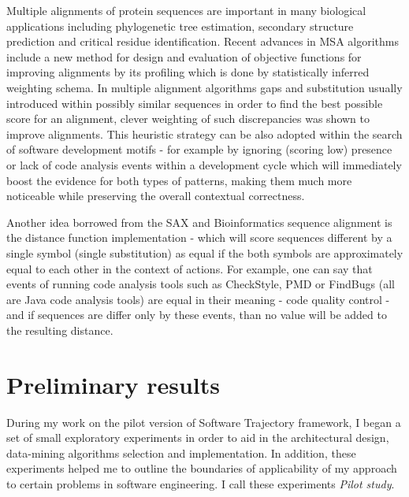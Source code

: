 \documentclass{sig-alternate}
\begin{document}
Multiple alignments of protein sequences are important in many biological applications including phylogenetic tree estimation, secondary structure prediction and critical residue identification. Recent advances in MSA algorithms \cite{citeulike:692} include a new method for design and evaluation of objective functions for improving alignments by its profiling which is done by statistically inferred weighting schema. In multiple alignment algorithms gaps and substitution usually introduced within possibly similar sequences in order to find the best possible score for an alignment, clever weighting of such discrepancies was shown to improve alignments. This heuristic strategy can be also adopted within the search of software development motifs - for example by ignoring (scoring low) presence or lack of code analysis events within a development cycle which will immediately boost the evidence for both types of patterns, making them much more noticeable while preserving the overall contextual correctness.

Another idea borrowed from the SAX and Bioinformatics sequence alignment is the distance function implementation - which will score sequences different by a single symbol (single substitution) as equal if the both symbols are approximately equal to each other in the context of actions. For example, one can say that events of running code analysis tools such as CheckStyle, PMD or FindBugs (all are Java code analysis tools) are equal in their meaning - code quality control - and if sequences are differ only by these events, than no value will be added to the resulting distance.

\section{Preliminary results}
During my work on the pilot version of Software Trajectory framework, I began a set of small exploratory experiments in order to aid in the architectural design, data-mining algorithms selection and implementation. In addition, these experiments helped me to outline the boundaries of applicability of my approach to certain problems in software engineering. I call these experiments \textit{Pilot study}.
\end{document}
